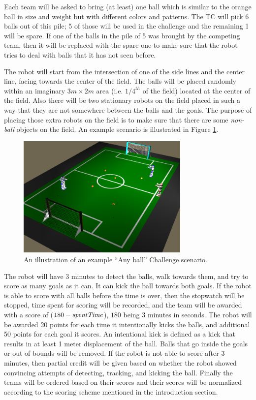 \documentclass{article}
\begin{document}
Each team will be asked to bring (at least) one ball which is similar to the orange ball in size and weight but with different colors and patterns. The TC will pick 6 balls out of this pile; 5 of those will be used in the challenge and the remaining 1 will be spare. If one of the balls in the pile of 5 was brought by the competing team, then it will be replaced with the spare one to make sure that the robot tries to deal with balls that it has not seen before.

The robot will start from the intersection of one of the side lines and the center line, facing towards the center of the field. The balls will be placed randomly within an imaginary $3m \times 2m$ area (i.e. $1/4^{th}$ of the field) located at the center of the field. Also there will be two stationary robots on the field placed in such a way that they are not somewhere between the balls and the goals. The purpose of placing those extra robots on the field is to make sure that there are some \emph{non-ball} objects on the field. An example scenario is illustrated in Figure \ref{fig:anyballchallenge}.

\begin{figure}[htbp]
 \centering
 \includegraphics[width=0.75\textwidth]{figures/nao_anyballchallenge.png}
 \caption{An illustration of an example ``Any ball'' Challenge scenario.}
 \label{fig:anyballchallenge}
\end{figure}

The robot will have 3 minutes to detect the balls, walk towards them, and try to score as many goals as it can. It can kick the ball towards both goals. If the robot is able to score with all balls before the time is over, then the stopwatch will be stopped, time spent for scoring will be recorded, and the team will be awarded with a score of ($180 - \emph{spentTime}$), $180$ being 3 minutes in seconds. The robot will be awarded 20 points for each time it intentionally kicks the balls, and additional 50 points for each goal it scores. An intentional kick is defined as a kick that results in at least 1 meter displacement of the ball. Balls that go inside the goals or out of bounds will be removed. If the robot is not able to score after 3 minutes, then partial credit will be given based on whether the robot showed convincing attempts of detecting, tracking, and kicking the ball. Finally the teams will be ordered based on their scores and their scores will be normalized according to the scoring scheme mentioned in the introduction section.
\end{document}
